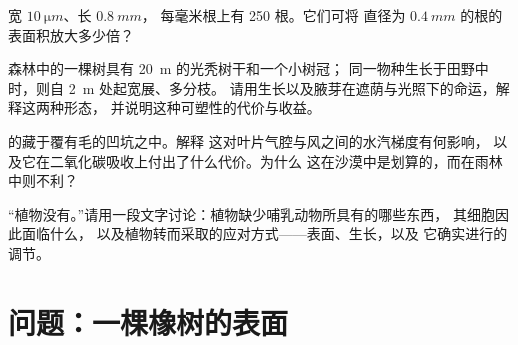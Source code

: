 \begin{exercise}[$\star\star$]\label{exo:b1:flowering-plant-organization:9}
宽 $\qty{10}{\micro m}$、长 $\qty{0.8}{mm}$，
每毫米根上有 \qty{250}{} 根。它们可将
直径为 $\qty{0.4}{mm}$ 的根的表面积放大多少倍？
\end{exercise}

\begin{exercise}[$\star\star\star$]\label{exo:b1:flowering-plant-organization:10}
森林中的一棵树具有 \qty{20}{m} 的光秃树干和一个小树冠；
同一物种生长于田野中时，则自 \qty{2}{m} 处起宽展、多分枝。
请用生长以及腋芽在遮荫与光照下的命运，解释这两种形态，
并说明这种可塑性的代价与收益。
\end{exercise}

\begin{exercise}[$\star\star\star$]\label{exo:b1:flowering-plant-organization:11}
的藏于覆有毛的凹坑之中。解释
这对叶片气腔与风之间的水汽梯度有何影响，
以及它在二氧化碳吸收上付出了什么代价。为什么
这在沙漠中是划算的，而在雨林中则不利？
\end{exercise}

\begin{exercise}[$\star\star\star$]\label{exo:b1:flowering-plant-organization:12}
“植物没有。”请用一段文字讨论：植物缺少哺乳动物所具有的哪些东西，
其细胞因此面临什么，
以及植物转而采取的应对方式——表面、生长，以及
它确实进行的调节。
\end{exercise}

\section{问题：一棵橡树的表面}


